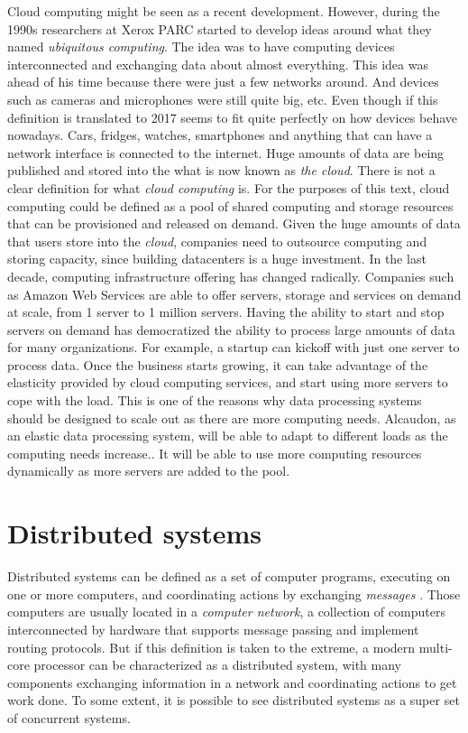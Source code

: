 Cloud computing might be seen as a recent development. However, during the 1990s
researchers at Xerox PARC started to develop ideas around what they named
\textit{ubiquitous computing}. The idea was to have computing devices
interconnected and exchanging data about almost everything. This idea was ahead
of his time because there were just a few networks around. And devices such as
cameras and microphones were still quite big, etc. Even though if this definition is
translated to 2017 seems to fit quite perfectly on how devices behave nowadays.
Cars, fridges, watches, smartphones and anything that can have a network
interface is connected to the internet. Huge amounts of data are being published
and stored into the what is now known as \textit{the cloud}. There is not a
clear definition for what \textit{cloud computing} is. For the purposes of this
text, cloud computing could be defined as a pool of shared computing and storage
resources that can be provisioned and released on demand. Given the huge amounts
of data that users store into the \textit{cloud}, companies need to outsource
computing and storing capacity, since building datacenters is a huge investment.
In the last decade, computing infrastructure offering has changed radically.
Companies such as Amazon Web Services are able to offer servers, storage and
services on demand at scale, from 1 server to 1 million servers. Having the
ability to start and stop servers on demand has democratized the ability to
process large amounts of data for many organizations. For example, a startup can
kickoff with just one server to process data. Once the business starts growing,
it can take advantage of the elasticity provided by cloud computing services,
and start using more servers to cope with the load. This is one of the reasons why
data processing systems should be designed to scale out as there are more
computing needs.
Alcaudon, as an elastic data processing system, will be able to adapt to
different loads as the computing needs increase.. It will be able to use more
computing resources dynamically as more servers are added to the pool.

\section{Distributed systems}
\label{subsection:distsys}

Distributed systems can be defined as a set of computer programs, executing on
one or more computers, and coordinating actions by exchanging \textit{messages}
\cite{GuideReliable}. Those computers are usually located in a \textit{computer
  network}, a collection of computers interconnected by hardware that supports
message passing and implement routing protocols. But if this definition is taken
to the extreme, a modern multi-core processor can be characterized as a
distributed system, with many components exchanging information in a network and
coordinating actions to get work done. To some extent, it is possible to see
distributed systems as a super set of concurrent systems.


